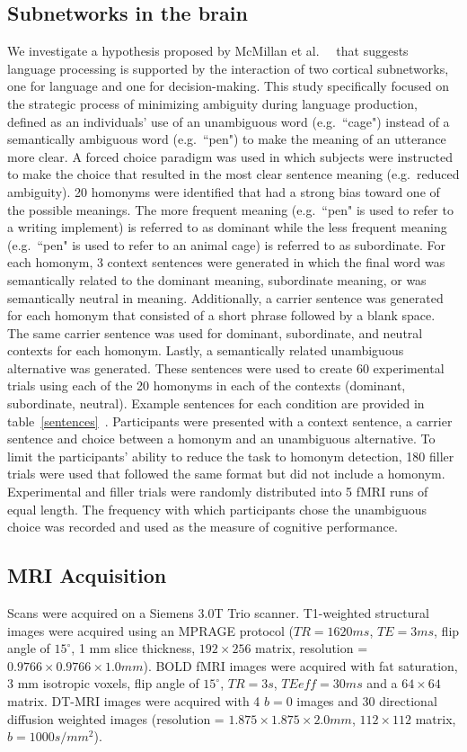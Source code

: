 \subsection{Subnetworks in the brain} 
We investigate a hypothesis proposed by McMillan et al.\ ~\cite{McMillan2010} that suggests language processing is supported by the interaction of two cortical subnetworks, one for language and one for decision-making. This study specifically focused on the strategic process of minimizing ambiguity during language production, defined as an individuals' use of an unambiguous word (e.g.\ ``cage") instead of a semantically ambiguous word (e.g.\ ``pen") to make the meaning of an utterance more clear. A forced choice paradigm was used in which subjects were instructed to make the choice that resulted in the most clear sentence meaning (e.g.\ reduced ambiguity). 20 homonyms were identified that had a strong bias toward one of the possible meanings. The more frequent meaning (e.g.\ ``pen" is used to refer to a writing implement) is referred to as dominant while the less frequent meaning (e.g.\ ``pen" is used to refer to an animal cage) is referred to as subordinate. For each homonym, 3 context sentences were generated in which the final word was semantically related to the dominant meaning, subordinate meaning, or was semantically neutral in meaning. Additionally, a carrier sentence was generated for each homonym that consisted of a short phrase followed by a blank space. The same carrier sentence was used for dominant, subordinate, and neutral contexts for each homonym.  Lastly, a semantically related unambiguous alternative was generated. These sentences were used to create 60 experimental trials using each of the 20 homonyms in each of the contexts (dominant, subordinate, neutral). Example sentences for each condition are provided in table~\ref{sentences}~\cite{McMillan2010}. Participants were presented with a context sentence, a carrier sentence and choice between a homonym and an unambiguous alternative. To limit the participants' ability to reduce the task to homonym detection, 180 filler trials were used that followed the same format but did not include a homonym. Experimental and filler trials were randomly distributed into 5 fMRI runs of equal length. The frequency with which participants chose the unambiguous choice was recorded and used as the measure of cognitive performance.

\subsection{MRI Acquisition}
Scans were acquired on a Siemens 3.0T Trio scanner. T1-weighted structural images were acquired using an MPRAGE protocol ($TR = 1620 ms$, $TE = 3 ms$, flip angle of $15^{\circ}$, 1 mm slice thickness, $192 \times 256$ matrix, resolution = $0.9766 \times 0.9766 \times 1.0 mm$). BOLD fMRI images were acquired with fat saturation, 3 mm isotropic voxels, flip angle of $15^{\circ}$, $TR = 3 s$, $TEeff = 30 ms$ and a $64 \times 64$ matrix. DT-MRI images were acquired with 4 $b=0$ images and 30 directional diffusion weighted images (resolution = $1.875 \times 1.875 \times 2.0 mm$, $112 \times 112$ matrix, $b=1000 s/mm^2$). 

